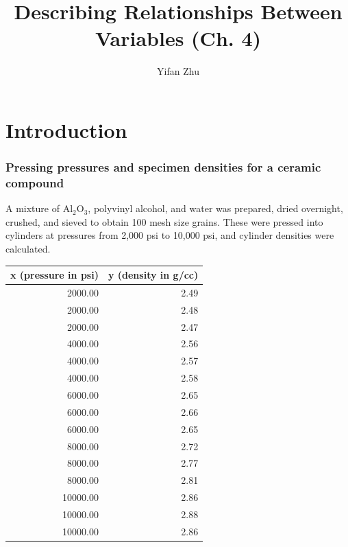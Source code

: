 \documentclass[handout]{beamer}
\title{Describing Relationships Between Variables (Ch. 4)}
\author{Yifan Zhu}
\date{}
\institute{Iowa State University}
\numberwithin{equation}{section}
\begin{document}


\begin{frame}
\titlepage
\end{frame}
 

\section{Introduction}

\begin{frame}
\frametitle{\small Pressing pressures and specimen densities for a ceramic compound}
\scriptsize
A mixture of $\text{Al}_2\text{O}_3$, polyvinyl alcohol, and water was prepared, dried overnight, crushed, and sieved to obtain 100 mesh size grains. These were pressed into cylinders at pressures from 2,000 psi to 10,000 psi, and cylinder densities were calculated. 

\begin{table}[ht]
\centering
\begin{tabular}{rr}
 x (pressure in psi) & y (density in g/cc) \\ 
  \hline
2000.00 & 2.49 \\ 
  2000.00 & 2.48 \\ 
  2000.00 & 2.47 \\ 
  4000.00 & 2.56 \\ 
  4000.00 & 2.57 \\ 
  4000.00 & 2.58 \\ 
  6000.00 & 2.65 \\ 
  6000.00 & 2.66 \\ 
  6000.00 & 2.65 \\ 
  8000.00 & 2.72 \\ 
  8000.00 & 2.77 \\ 
  8000.00 & 2.81 \\ 
  10000.00 & 2.86 \\ 
  10000.00 & 2.88 \\ 
  10000.00 & 2.86 \\ 
  \end{tabular}
\end{table}\end{frame}
\end{document}
